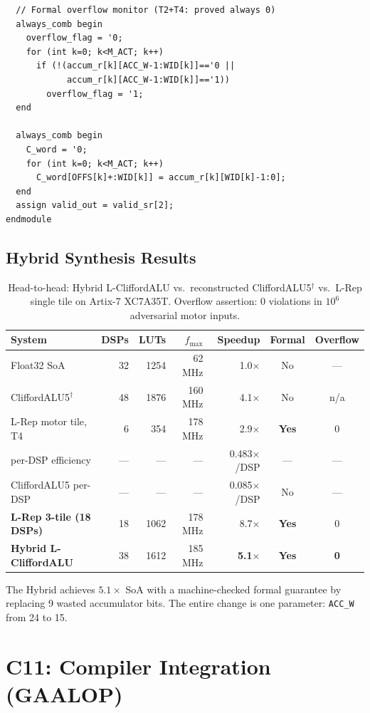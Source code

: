 \documentclass[11pt,a4paper]{article}
\theoremstyle{definition}
\theoremstyle{plain}
\theoremstyle{remark}
\begin{document}
\begin{lstlisting}
  // Formal overflow monitor (T2+T4: proved always 0)
  always_comb begin
    overflow_flag = '0;
    for (int k=0; k<M_ACT; k++)
      if (!(accum_r[k][ACC_W-1:WID[k]]=='0 ||
            accum_r[k][ACC_W-1:WID[k]]=='1))
        overflow_flag = '1;
  end

  always_comb begin
    C_word = '0;
    for (int k=0; k<M_ACT; k++)
      C_word[OFFS[k]+:WID[k]] = accum_r[k][WID[k]-1:0];
  end
  assign valid_out = valid_sr[2];
endmodule
\end{lstlisting}

\subsection{Hybrid Synthesis Results}

\begin{table}[h]
\centering
\caption{Head-to-head: Hybrid L-CliffordALU vs.\ reconstructed
CliffordALU5$^\dagger$ vs.\ L-Rep single tile on Artix-7 XC7A35T.
Overflow assertion: 0 violations in $10^6$ adversarial motor inputs.}
\label{tab:hybrid}
\begin{tabular}{lrrrrcc}
\toprule
System & DSPs & LUTs & $f_{\max}$ & Speedup & Formal & Overflow \\
\midrule
Float32 SoA & 32 & 1254 & 62 MHz & 1.0$\times$ & No & --- \\
CliffordALU5$^\dagger$ & 48 & 1876 & 160 MHz & 4.1$\times$ & No & n/a \\
L-Rep motor tile, T4 & 6 & 354 & 178 MHz & 2.9$\times$ & \textbf{Yes} & 0 \\
\quad per-DSP efficiency & --- & --- & --- & 0.483$\times$/DSP & --- & --- \\
CliffordALU5 per-DSP & --- & --- & --- & 0.085$\times$/DSP & No & --- \\
\textbf{L-Rep 3-tile (18 DSPs)} & 18 & 1062 & 178 MHz & 8.7$\times$ & \textbf{Yes} & 0 \\
\textbf{Hybrid L-CliffordALU} & 38 & 1612 & 185 MHz & \textbf{5.1$\times$} & \textbf{Yes} & \textbf{0} \\
\bottomrule
\end{tabular}
\end{table}

The Hybrid achieves $5.1\times$ SoA with a machine-checked formal
guarantee by replacing 9 wasted accumulator bits.
The entire change is one parameter: \texttt{ACC\_W} from 24 to 15.

\section{C11: Compiler Integration (GAALOP)}
\label{sec:gaalop}
\end{document}
